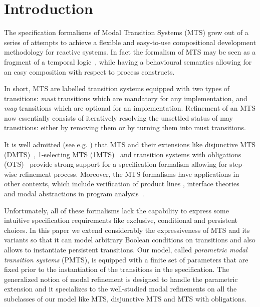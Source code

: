\section{Introduction}
The  specification  formalisms   of  Modal  Transition  Systems  (MTS)
\cite{DBLP:conf/lics/LarsenT88,AHLNW:EATCS:08} grew out of a series of
attempts   to  achieve  a   flexible  and   easy-to-use  compositional
development methodology  for reactive systems.  In  fact the formalism
of   MTS   may   be   seen   as   a   fragment   of  a 
temporal   logic~\cite{DBLP:journals/tcs/BoudolL92},   
while   having   a   behavioural
semantics  allowing  for an easy  composition with  respect  to  process
constructs.

In short, MTS are labelled  transition systems equipped with two types
of  transitions: \emph{must}  transitions which are mandatory  for any
implementation, and  \emph{may} transitions  which are optional  for an
implementation.   Refinement  of an   MTS  now  essentially  consists of
iteratively resolving the unsettled  status of may transitions: either
by removing them or by turning them into must transitions.

It is  well admitted (see e.g. \cite{RBBCP:ACSD:09}) that MTS  and their
extensions              like              disjunctive              MTS
(DMTS)~\cite{DBLP:conf/lics/LarsenX90}, %
1-selecting MTS  (1MTS)~\cite{FS:JLAP:08} and transition  systems with
obligations   (OTS)~\cite{benes_et_al:OASIcs:2011:3070}   provide  strong
support  for a specification  formalism allowing  for step-wise refinement
process.   Moreover,  the MTS  formalisms  have  applications in  other
contexts,   which   include   verification  of   product   lines
\cite{DBLP:conf/fmoods/GrulerLS08,LarsenNW07},
interface theories~\cite{UC:FSE:04,RBBCP:ACSD:09}
and
modal abstractions in 
program analysis~\cite{GHJ:CONCUR:01,HJS:ESOP:01,NNN:SAS:08}.

Unfortunately, all  of these formalisms lack the  capability to express
some intuitive specification  requirements like exclusive, conditional
and  persistent choices.  In this  paper we  extend considerably the
expressiveness of MTS and its variants so that it can model
arbitrary Boolean conditions on transitions and also allows to instantiate persistent
transitions. Our model, called \emph{parametric modal transition systems} (PMTS),
is equipped with a finite set of parameters that
are fixed prior to the instantiation of the transitions in the specification.
The generalized notion of modal refinement is designed to handle the parametric
extension and it specializes to
the well-studied modal refinements on all the subclasses of our model
like
MTS, disjunctive MTS and MTS with obligations.

